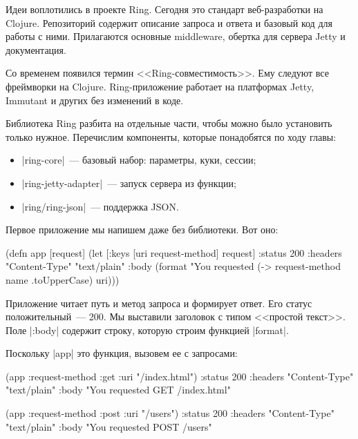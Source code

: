 \label{ring-jetty}

Идеи воплотились в проекте Ring.
Сегодня это стандарт веб-разработки на Clojure. Репозиторий содержит описание
запроса и ответа и базовый код для работы с ними. Прилагаются основные middleware,
обертка для сервера Jetty и документация.

Со временем появился термин <<Ring-совместимость>>. Ему следуют все фреймворки
на Clojure. Ring-приложение работает на платформах Jetty, Immutant и других без
изменений в коде.

Библиотека Ring разбита на отдельные части, чтобы можно было установить только
нужное. Перечислим компоненты, которые понадобятся по ходу главы:

\begin{itemize}

\item
  \spverb|ring-core|~--- базовый набор: параметры, куки, сессии;

\item
  \spverb|ring-jetty-adapter|~--- запуск сервера из функции;

\item
  \spverb|ring/ring-json|~--- поддержка JSON.

\end{itemize}

Первое приложение мы напишем даже без библиотеки. Вот оно:

\label{first-handler}

\begin{english}
  \begin{clojure}
(defn app [request]
  (let [{:keys [uri request-method]} request]
    {:status 200
     :headers {"Content-Type" "text/plain"}
     :body (format "You requested %
                   (-> request-method name .toUpperCase)
                   uri)}))
  \end{clojure}
\end{english}

Приложение читает путь и метод запроса и формирует ответ. Его статус
положительный~--- 200. Мы выставили заголовок с типом <<простой текст>>. Поле
\spverb|:body| содержит строку, которую строим функцией \spverb|format|.

Поскольку \spverb|app| это функция, вызовем ее с запросами:

\begin{english}
  \begin{clojure}
(app {:request-method :get :uri "/index.html"})
{:status 200
 :headers {"Content-Type" "text/plain"}
 :body "You requested GET /index.html"}

(app {:request-method :post :uri "/users"})
{:status 200
 :headers {"Content-Type" "text/plain"}
 :body "You requested POST /users"}
  \end{clojure}
\end{english}


